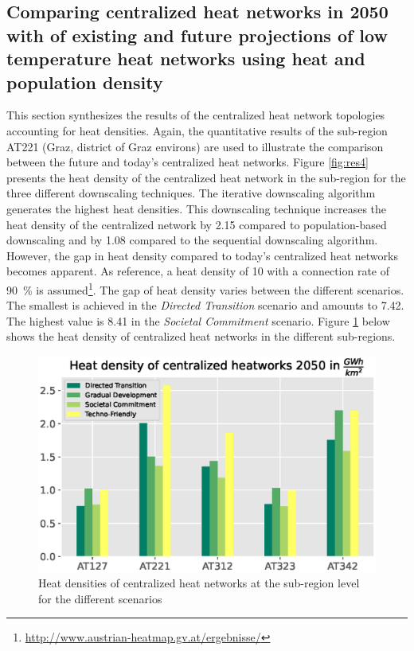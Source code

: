 \subsection{Comparing centralized heat networks in 2050 with of existing and future projections of low temperature heat networks using heat and population density}\label{res:5}
This section synthesizes the results of the centralized heat network topologies accounting for heat densities. Again, the quantitative results of the sub-region AT221 (Graz, district of Graz environs) are used to illustrate the comparison between the future and today's centralized heat networks. Figure \ref{fig:res4} presents the heat density of the centralized heat network in the sub-region for the three different downscaling techniques. The iterative downscaling algorithm generates the highest heat densities. This downscaling technique increases the heat density of the centralized network by \SI{2.15}{} compared to population-based downscaling and by \SI{1.08}{} compared to the sequential downscaling algorithm. However, the gap in heat density compared to today's centralized heat networks becomes apparent. As reference, a heat density of \SI{10}{} with a connection rate of \SI{90}{\%} is assumed\footnote{\url{http://www.austrian-heatmap.gv.at/ergebnisse/}}. The gap of heat density varies between the different scenarios. The smallest is achieved in the \textit{Directed Transition} scenario and amounts to \SI{7.42}{}. The highest value is \SI{8.41}{} in the \textit{Societal Commitment} scenario. Figure \ref{fig:res5} below shows the heat density of centralized heat networks in the different sub-regions. 
\begin{figure}[h]
	\centering
	\includegraphics[width=0.95\linewidth]{figures/4_Results/plot.eps}
	\caption{Heat densities of centralized heat networks at the sub-region level for the different scenarios}
	\label{fig:res5}
\end{figure}

